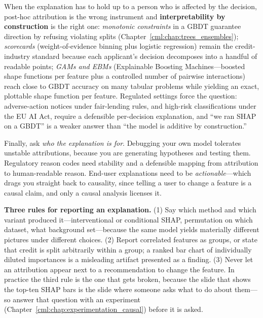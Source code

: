 When the explanation has to hold up to a person who is affected by the decision, post-hoc attribution is the wrong instrument and \textbf{interpretability by construction} is the right one: \emph{monotonic constraints} in a GBDT guarantee direction by refusing violating splits (Chapter~\ref{cml:chap:trees_ensembles}); \emph{scorecards} (weight-of-evidence binning plus logistic regression) remain the credit-industry standard because each applicant's decision decomposes into a handful of readable points; \emph{GAMs and EBMs} (Explainable Boosting Machines---boosted shape functions per feature plus a controlled number of pairwise interactions) reach close to GBDT accuracy on many tabular problems while yielding an exact, plottable shape function per feature. Regulated settings force the question: adverse-action notices under fair-lending rules, and high-risk classifications under the EU AI Act, require a defensible per-decision explanation, and ``we ran SHAP on a GBDT'' is a weaker answer than ``the model is additive by construction.''

Finally, ask \emph{who the explanation is for}. Debugging your own model tolerates unstable attributions, because you are generating hypotheses and testing them. Regulatory reason codes need stability and a defensible mapping from attribution to human-readable reason. End-user explanations need to be \emph{actionable}---which drags you straight back to causality, since telling a user to change a feature is a causal claim, and only a causal analysis licenses it.

\begin{warningbox}
\textbf{Three rules for reporting an explanation.} (1) Say which method and which variant produced it---interventional or conditional SHAP, permutation on which dataset, what background set---because the same model yields materially different pictures under different choices. (2) Report correlated features as groups, or state that credit is split arbitrarily within a group; a ranked bar chart of individually diluted importances is a misleading artifact presented as a finding. (3) Never let an attribution appear next to a recommendation to change the feature. In practice the third rule is the one that gets broken, because the slide that shows the top-ten SHAP bars is the slide where someone asks what to do about them---so answer that question with an experiment (Chapter~\ref{cml:chap:experimentation_causal}) before it is asked.
\end{warningbox}

